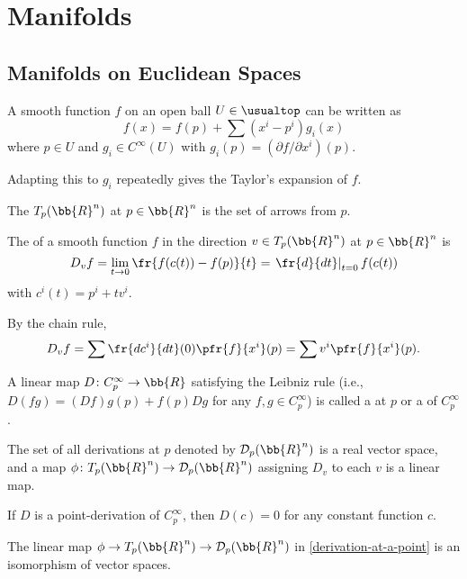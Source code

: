 \section{Manifolds}\cite{loring}
\subsection{Manifolds on Euclidean Spaces}
A smooth function $f$ on an open ball $U \in \usualtop$ can be written as
\[
f(x) = f(p) + \sum (x^i - p^i) g_i(x)
\]
where $p \in U$ and $g_i \in C^\infty (U)$ with $g_i(p) = (\partial f / \partial x^i)(p)$.

Adapting this to $g_i$ repeatedly gives the Taylor's expansion of $f$.

The  $T_p (\bb{R}^n)$ at $p \in \bb{R}^n$ is the set of arrows from $p$.

The  of a smooth function $f$ in the direction $v \in T_p(\bb{R}^n)$ at $p \in \bb{R}^n$ is
\[
D_v f = \lim_{t \to 0} \fr{f(c(t)) - f(p)}{t} = \left. \fr{d}{dt}\right|_{t=0} f(c(t))
\]
with $c^i(t) = p^i + tv^i$.

By the chain rule,
\[
D_v f = \sum \fr{dc^i}{dt}(0)\pfr{f}{x^i}(p) = \sum v^i \pfr{f}{x^i}(p).
\]

A linear map $D \colon C_p^\infty \to \bb{R}$ satisfying the Leibniz rule (i.e., $D(fg) = (D f)g(p) + f(p)D g$ for any $f, g \in C_p^\infty$) is called a  at $p$ or a  of $C_p^\infty$.

The set of all derivations at $p$ denoted by $\mathcal{D}_p(\bb{R}^n)$ is a real vector space, and a map $\phi \colon T_p(\bb{R}^n) \to \mathcal{D}_p(\bb{R}^n)$ assigning $D_v$ to each $v$ is a linear map.

If $D$ is a point-derivation of $C_p^\infty$, then $D(c) = 0$ for any constant function $c$.

The linear map $\phi \to T_p(\bb{R}^n) \to \mathcal{D}_p(\bb{R}^n)$ in \ref{derivation-at-a-point} is an isomorphism of vector spaces.

